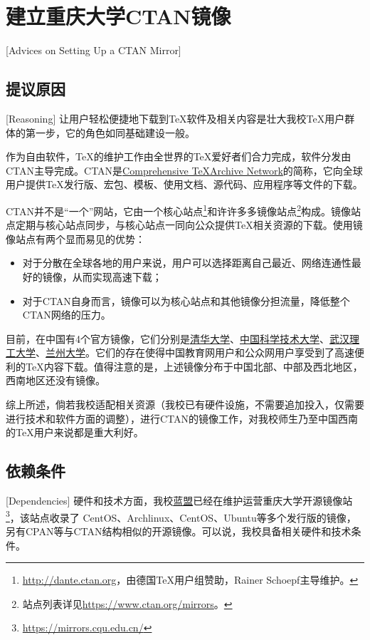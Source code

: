 \section{建立重庆大学CTAN镜像}[Advices on Setting Up a CTAN Mirror]\label{sec:ctanMirror}
\subsection{提议原因}[Reasoning]
让用户轻松便捷地下载到\TeX 软件及相关内容是壮大我校\TeX 用户群体的第一步，它的角色如同基础建设一般。

作为自由软件，\TeX 的维护工作由全世界的\TeX 爱好者们合力完成，软件分发由CTAN主导完成。CTAN是\href{https://www.ctan.org/}{Comprehensive \TeX Archive Network}的简称，它向全球用户提供\TeX 发行版、宏包、模板、使用文档、源代码、应用程序等文件的下载。

CTAN并不是“一个”网站，它由一个核心站点\footnote{\url{http://dante.ctan.org}，由德国\TeX 用户组赞助，Rainer Schoepf主导维护。}和许许多多镜像站点\footnote{站点列表详见\url{https://www.ctan.org/mirrors}。}构成。镜像站点定期与核心站点同步，与核心站点一同向公众提供\TeX 相关资源的下载。使用镜像站点有两个显而易见的优势：

\begin{itemize}
	\item 对于分散在全球各地的用户来说，用户可以选择距离自己最近、网络连通性最好的镜像，从而实现高速下载；
	\item 对于CTAN自身而言，镜像可以为核心站点和其他镜像分担流量，降低整个CTAN网络的压力。
\end{itemize}

目前，在中国有4个官方镜像，它们分别是\href{http://mirrors.tuna.tsinghua.edu.cn/CTAN/}{清华大学}、\href{http://mirrors.ustc.edu.cn/CTAN/}{中国科学技术大学}、\href{http://mirrors.hust.edu.cn/CTAN/}{武汉理工大学}、\href{http://mirror.lzu.edu.cn/CTAN/}{兰州大学}。它们的存在使得中国教育网用户和公众网用户享受到了高速便利的\TeX 内容下载。值得注意的是，上述镜像分布于中国北部、中部及西北地区，西南地区还没有镜像。

综上所述，倘若我校适配相关资源（我校已有硬件设施，不需要追加投入，仅需要进行技术和软件方面的调整），进行CTAN的镜像工作，对我校师生乃至中国西南的\TeX 用户来说都是重大利好。

\subsection{依赖条件}[Dependencies]
硬件和技术方面，我校\href{http://lanunion.cqu.edu.cn/}{蓝盟}已经在维护运营重庆大学开源镜像站\footnote{\url{https://mirrors.cqu.edu.cn/}}，该站点收录了 CentOS、Archlinux、CentOS、Ubuntu等多个发行版的镜像，另有CPAN等与CTAN结构相似的开源镜像。可以说，我校具备相关硬件和技术条件。

